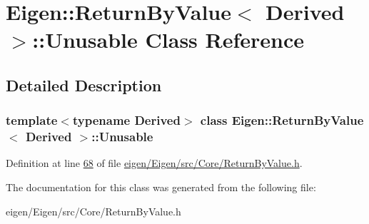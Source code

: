 \hypertarget{class_eigen_1_1_return_by_value_1_1_unusable}{}\section{Eigen\+:\+:Return\+By\+Value$<$ Derived $>$\+:\+:Unusable Class Reference}
\label{class_eigen_1_1_return_by_value_1_1_unusable}


\subsection{Detailed Description}
\subsubsection*{template$<$typename Derived$>$\newline
class Eigen\+::\+Return\+By\+Value$<$ Derived $>$\+::\+Unusable}



Definition at line \hyperlink{eigen_2_eigen_2src_2_core_2_return_by_value_8h_source_l00068}{68} of file \hyperlink{eigen_2_eigen_2src_2_core_2_return_by_value_8h_source}{eigen/\+Eigen/src/\+Core/\+Return\+By\+Value.\+h}.



The documentation for this class was generated from the following file\+:\begin{DoxyCompactItemize}
\item 
eigen/\+Eigen/src/\+Core/\+Return\+By\+Value.\+h\end{DoxyCompactItemize}
